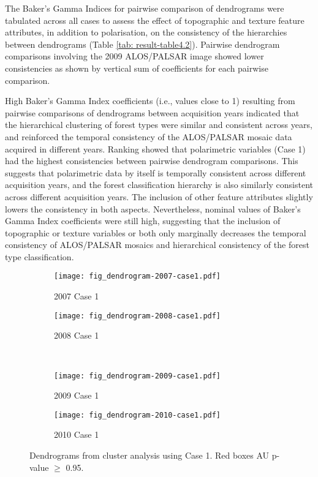 The Baker's Gamma Indices for pairwise comparison of dendrograms were tabulated across all cases to assess the effect of topographic and texture feature attributes, in addition to polarisation, on the consistency of the hierarchies between dendrograms (Table \ref{tab: result-table4.2}). Pairwise dendrogram comparisons involving the 2009 ALOS/PALSAR image showed lower consistencies as shown by vertical sum of coefficients for each pairwise comparison.

High Baker's Gamma Index coefficients (i.e., values close to 1) resulting from pairwise comparisons of dendrograms between acquisition years indicated that the hierarchical clustering of forest types were similar and consistent across years, and reinforced the temporal consistency of the ALOS/PALSAR mosaic data acquired in different years. Ranking showed that polarimetric variables (Case 1) had the highest consistencies between pairwise dendrogram comparisons. This suggests that polarimetric data by itself is temporally consistent across different acquisition years, and the forest classification hierarchy is also similarly consistent across different acquisition years. The inclusion of other feature attributes slightly lowers the consistency in both aspects. Nevertheless, nominal values of Baker’s Gamma Index coefficients were still high, suggesting that the inclusion of topographic or texture variables or both only marginally decreases the temporal consistency of ALOS/PALSAR mosaics and hierarchical consistency of the forest type classification.

\begin{figure}[!ht] \centering
	\captionsetup[subfigure]{width=2.0in} %
	\begin{subfigure}[t]{0.49\textwidth}
		\texttt{[image: fig\_dendrogram-2007-case1.pdf]}
		\caption[Case 1 cluster dendrograms.]{2007 Case 1}
		\label{fig: result-fig4.8a}
	\end{subfigure}
	\begin{subfigure}[t]{0.49\textwidth}
		\texttt{[image: fig\_dendrogram-2008-case1.pdf]}
		\caption[Case 1 cluster dendrograms.]{2008 Case 1}
		\label{fig: result-fig4.8b}
	\end{subfigure}\\
	\vspace{15pt}
	\begin{subfigure}[t]{0.49\textwidth}
		\texttt{[image: fig\_dendrogram-2009-case1.pdf]}
		\caption[Case 1 cluster dendrograms.]{2009 Case 1}
		\label{fig: result-fig4.8c}
	\end{subfigure}
	\begin{subfigure}[t]{0.49\textwidth}
		\texttt{[image: fig\_dendrogram-2010-case1.pdf]}
		\caption[Case 1 cluster dendrograms.]{2010 Case 1}
		\label{fig: result-fig4.8d}
	\end{subfigure}
	\vspace{5pt}
	\caption[Dendrograms from cluster analysis using Case 1.]{Dendrograms from cluster analysis using Case 1. Red boxes AU p-value $\geq$ 0.95.}
	\label{fig: result-fig4.8}
\end{figure}

